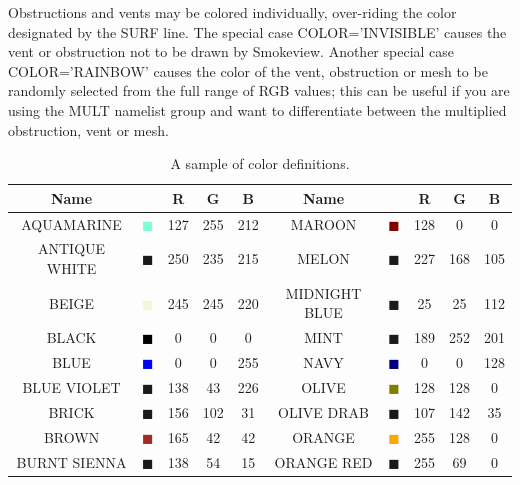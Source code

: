\documentclass[11pt]{book}
\begin{document}
Obstructions and vents may be colored individually, over-riding the color designated by the {\ct SURF} line. The special case {\ct COLOR='INVISIBLE'} causes the vent or obstruction not to be drawn by Smokeview. Another special case {\ct COLOR='RAINBOW'} causes the color of the vent, obstruction or mesh to be randomly selected from the full range of RGB values; this can be useful if you are using the {\ct MULT} namelist group and want to differentiate between the multiplied obstruction, vent or mesh.


\begin{table}[p]
\begin{center}
\caption[A sample of color definitions]{A sample of color definitions.}
\label{tab:colors}
\vspace{0.1in}
\begin{tabular}{|c|c|c|c|c|c||c|c|c|c|}
\hline
Name & &  R  & G & B & Name & & R & G & B   \\ \hline \hline
{\ct AQUAMARINE} & \textcolor{AQUAMARINE} {$\blacksquare$} & 127& 255& 212& {\ct MAROON} &  \textcolor{MAROON} {$\blacksquare$} & 128& 0& 0  \\ \hline
{\ct ANTIQUE WHITE} & \textcolor{ANTIQUE WHITE} {$\blacksquare$} & 250& 235& 215& {\ct MELON} &  \textcolor{MELON} {$\blacksquare$} & 227& 168& 105  \\ \hline
{\ct BEIGE} & \textcolor{BEIGE} {$\blacksquare$} & 245& 245& 220& {\ct MIDNIGHT BLUE} &  \textcolor{MIDNIGHT BLUE} {$\blacksquare$} & 25& 25& 112  \\ \hline
{\ct BLACK} & \textcolor{BLACK} {$\blacksquare$} & 0& 0& 0& {\ct MINT} &  \textcolor{MINT} {$\blacksquare$} & 189& 252& 201  \\ \hline
{\ct BLUE} & \textcolor{BLUE} {$\blacksquare$} & 0& 0& 255& {\ct NAVY} &  \textcolor{NAVY} {$\blacksquare$} & 0& 0& 128  \\ \hline
{\ct BLUE VIOLET} & \textcolor{BLUE VIOLET} {$\blacksquare$} & 138& 43& 226& {\ct OLIVE} &  \textcolor{OLIVE} {$\blacksquare$} & 128& 128& 0  \\ \hline
{\ct BRICK} & \textcolor{BRICK} {$\blacksquare$} & 156& 102& 31& {\ct OLIVE DRAB} &  \textcolor{OLIVE DRAB} {$\blacksquare$} & 107& 142& 35  \\ \hline
{\ct BROWN} & \textcolor{BROWN} {$\blacksquare$} & 165& 42& 42& {\ct ORANGE} &  \textcolor{ORANGE} {$\blacksquare$} & 255& 128& 0  \\ \hline
{\ct BURNT SIENNA} & \textcolor{BURNT SIENNA} {$\blacksquare$} & 138& 54& 15& {\ct ORANGE RED} &  \textcolor{ORANGE RED} {$\blacksquare$} & 255& 69& 0  \\ \hline

\end{tabular}
\end{center}
\end{table}
\end{document}
